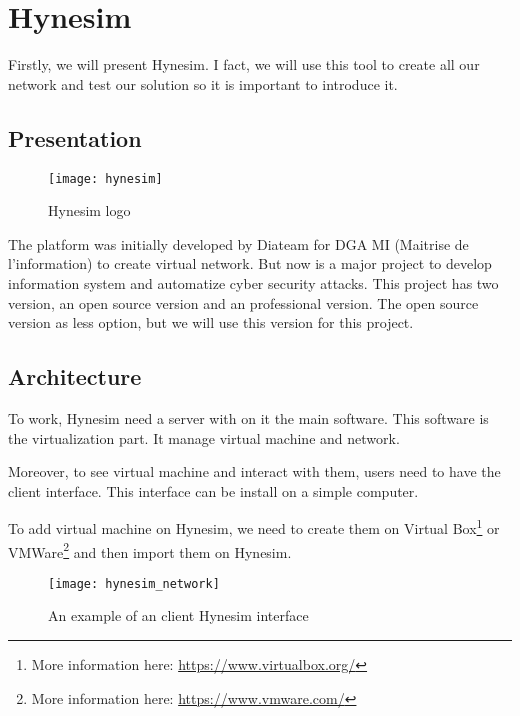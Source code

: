 
\chapter{Hynesim}
\label{chap:hynesim}

Firstly, we will present Hynesim. I fact, we will use this tool to create all our network and test our solution so
it is important to introduce it.

\section{Presentation}

\begin{figure}[h]
  \centering
  \texttt{[image: hynesim]}
  \caption{Hynesim logo}
  \label{fig:hynesim}
\end{figure}



The platform was initially developed by Diateam for DGA MI (Maitrise de l'information) to create virtual network.
But now is a major project to develop information system and automatize cyber security attacks. This project has
two version, an open source version and an professional version. The open source version as less option, but we
will use this version for this project.

\section{Architecture}

To work, Hynesim need a server with on it the main software. This software is the virtualization part. It manage
virtual machine and network.

Moreover, to see virtual machine and interact with them, users need to have the client interface. This interface
can be install on a simple computer.

To add virtual machine on Hynesim, we need to create them on Virtual Box\footnote{More information here:
  \url{https://www.virtualbox.org/}} or VMWare\footnote{More information here: \url{https://www.vmware.com/}} and then import them on Hynesim.

\begin{figure}[h]
  \centering
  \texttt{[image: hynesim\_network]}
  \caption{An example of an client Hynesim interface}
\end{figure}






